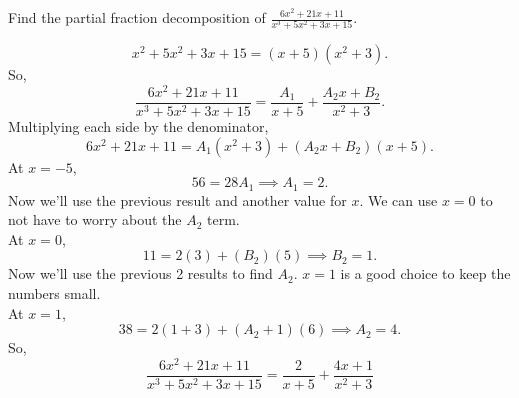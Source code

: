 \begin{example}
	Find the partial fraction decomposition of $\frac{6x^2+21x+11}{x^3+5x^2+3x+15}$.
\end{example}
\begin{equation*}
	x^2+5x^2+3x+15 = (x+5)(x^2+3).
\end{equation*}
So,
\begin{equation*}
	\frac{6x^2+21x+11}{x^3+5x^2+3x+15} = \frac{A_1}{x+5}+\frac{A_2x+B_2}{x^2+3}.
\end{equation*}
Multiplying each side by the denominator,
\begin{equation*}
	6x^2+21x+11 = A_1(x^2+3)+(A_2x+B_2)(x+5).
\end{equation*}
At $x=-5$,
\begin{equation*}
	56 = 28A_1 \implies A_1 = 2.
\end{equation*}
Now we'll use the previous result and another value for $x$. We can use $x=0$ to not have to worry about the $A_2$ term.\\
At $x=0$,
\begin{equation*}
	11 = 2(3) + (B_2)(5) \implies B_2 = 1.
\end{equation*}
Now we'll use the previous 2 results to find $A_2$. $x=1$ is a good choice to keep the numbers small.\\
At $x=1$,
\begin{equation*}
	38 = 2(1+3)+(A_2+1)(6) \implies A_2 = 4.
\end{equation*}
So,
\begin{equation*}
	\frac{6x^2+21x+11}{x^3+5x^2+3x+15} = \frac{2}{x+5}+\frac{4x+1}{x^2+3}
\end{equation*}